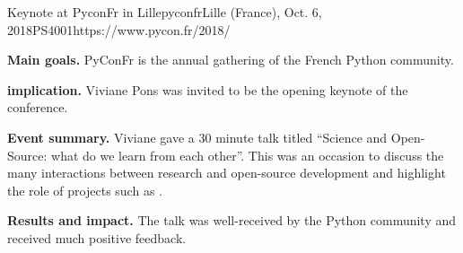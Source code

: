 \begin{event}{Keynote at PyconFr in Lille}{pyconfr}{Lille (France), Oct. 6, 2018}{PS}{400}{1}{https://www.pycon.fr/2018/}

\textbf{Main goals.} PyConFr is the annual gathering of the French Python community.

\textbf{\ODK implication.} Viviane Pons was invited to be the opening keynote of the conference.

\textbf{Event summary.} Viviane gave a 30 minute talk titled ``Science and Open-Source: what do we learn from each other''. This was an occasion to discuss the many interactions between research and open-source development and highlight the role of projects such as \ODK.

\textbf{Results and impact.} The talk was well-received by the Python community and received much positive feedback.

\end{event}
